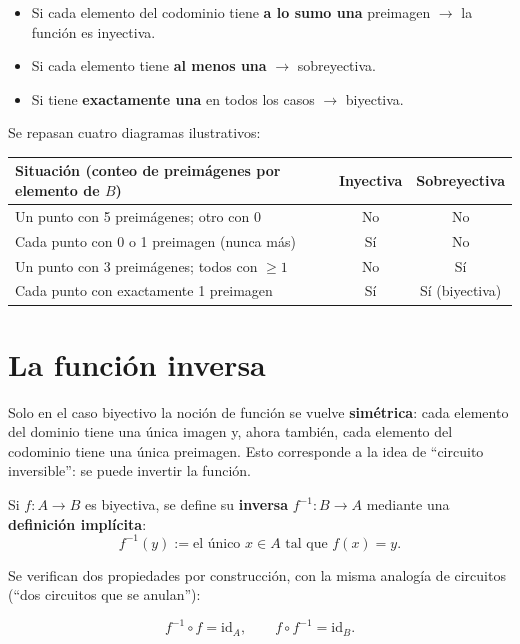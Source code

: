 \documentclass[12pt,a4paper]{article}
\begin{document}
\begin{itemize}
  \item Si cada elemento del codominio tiene \textbf{a lo sumo una} preimagen $\to$ la función es inyectiva.
  \item Si cada elemento tiene \textbf{al menos una} $\to$ sobreyectiva.
  \item Si tiene \textbf{exactamente una} en todos los casos $\to$ biyectiva.
\end{itemize}

Se repasan cuatro diagramas ilustrativos:

\begin{table}[H]
\centering
\begin{tabular}{@{}p{7.8cm}cc@{}}
\toprule
Situación (conteo de preimágenes por elemento de $B$) & Inyectiva & Sobreyectiva \\
\midrule
Un punto con 5 preimágenes; otro con 0 & No & No \\
Cada punto con 0 o 1 preimagen (nunca más) & Sí & No \\
Un punto con 3 preimágenes; todos con $\geq 1$ & No & Sí \\
Cada punto con exactamente 1 preimagen & Sí & Sí (biyectiva) \\
\bottomrule
\end{tabular}
\end{table}



\section{La función inversa}

Solo en el caso biyectivo la noción de función se vuelve \textbf{simétrica}: cada elemento del dominio tiene una única imagen y, ahora también, cada elemento del codominio tiene una única preimagen. Esto corresponde a la idea de ``circuito inversible'': se puede invertir la función.

Si $f:A\to B$ es biyectiva, se define su \textbf{inversa} $f^{-1}:B\to A$ mediante una \textbf{definición implícita}:
$$f^{-1}(y) := \text{el único } x \in A \text{ tal que } f(x)=y.$$

Se verifican dos propiedades por construcción, con la misma analogía de circuitos (``dos circuitos que se anulan''):

\begin{keybox}
$$\boxed{f^{-1}\circ f = \mathrm{id}_A, \qquad f\circ f^{-1} = \mathrm{id}_B.}$$
\end{keybox}
\end{document}
